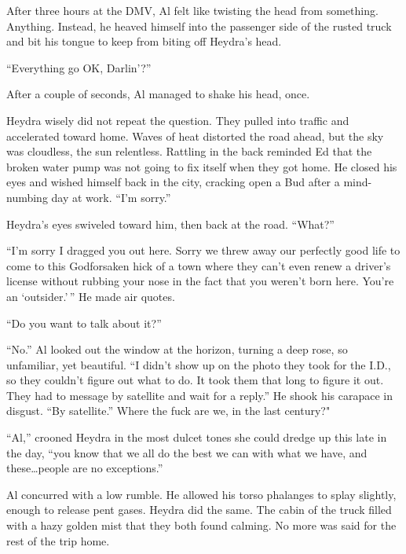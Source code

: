 
After three hours at the DMV, Al felt like twisting the head from
something. Anything. Instead, he heaved himself into the passenger side
of the rusted truck and bit his tongue to keep from biting off Heydra's
head.

``Everything go OK, Darlin'?''

After a couple of seconds, Al managed to shake his head, once.

Heydra wisely did not repeat the question. They pulled into traffic and
accelerated toward home. Waves of heat distorted the road ahead, but the
sky was cloudless, the sun relentless. Rattling in the back reminded Ed
that the broken water pump was not going to fix itself when they got
home. He closed his eyes and wished himself back in the city, cracking
open a Bud after a mind-numbing day at work. ``I'm sorry.''

Heydra's eyes swiveled toward him, then back at the road. ``What?''

``I'm sorry I dragged you out here. Sorry we threw away our perfectly
good life to come to this Godforsaken hick of a town where they can't
even renew a driver's license without rubbing your nose in the fact that
you weren't born here. You're an `outsider.'\,'' He made air quotes.

``Do you want to talk about it?''

``No.'' Al looked out the window at the horizon, turning a deep rose, so
unfamiliar, yet beautiful. ``I didn't show up on the photo they took for
the I.D., so they couldn't figure out what to do. It took them that long
to figure it out. They had to message by satellite and wait for a
reply.'' He shook his carapace in disgust. ``By satellite.'' Where the
fuck are we, in the last century?"

``Al,'' crooned Heydra in the most dulcet tones she could dredge up this
late in the day, ``you know that we all do the best we can with what we
have, and these\ldots people are no exceptions.''

Al concurred with a low rumble. He allowed his torso phalanges to splay
slightly, enough to release pent gases. Heydra did the same. The cabin
of the truck filled with a hazy golden mist that they both found
calming. No more was said for the rest of the trip home.
